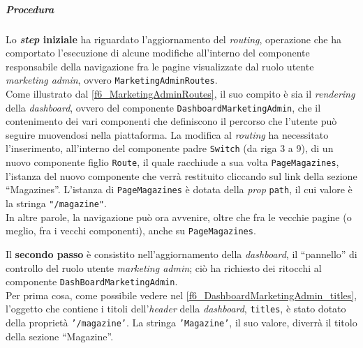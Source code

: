 \subparagraph{Procedura}
Lo \textbf{\textit{step} iniziale} ha riguardato l'aggiornamento del \textit{routing}, operazione che ha comportato l'esecuzione di alcune modifiche all'interno del componente responsabile della navigazione fra le pagine visualizzate dal ruolo utente \textit{marketing admin}, ovvero \texttt{MarketingAdminRoutes}.\\
Come illustrato dal \autoref{f6_MarketingAdminRoutes}, il suo compito è sia il \textit{rendering} della \textit{dashboard}, ovvero del componente \texttt{DashboardMarketingAdmin}, che il contenimento dei vari componenti che definiscono il percorso che l'utente può seguire muovendosi nella piattaforma. La modifica al \textit{routing} ha necessitato l'inserimento, all'interno del componente padre \texttt{Switch} (da riga 3 a 9), di un nuovo componente figlio \texttt{Route}, il quale racchiude a sua volta \texttt{PageMagazines}, l'istanza del nuovo componente che verrà restituito cliccando sul link della sezione “Magazines”. L'istanza di \texttt{PageMagazines} è dotata della \textit{prop} \texttt{path}, il cui valore è la stringa \texttt{"/magazine"}.\\
In altre parole, la navigazione può ora avvenire, oltre che fra le vecchie pagine (o meglio, fra i vecchi componenti), anche su \texttt{PageMagazines}.



Il \textbf{secondo passo} è consistito nell'aggiornamento della \textit{dashboard}, il “pannello” di controllo del ruolo utente \textit{marketing admin}; ciò ha richiesto dei ritocchi al componente \texttt{DashBoardMarketingAdmin}.\\ 
Per prima cosa, come possibile vedere nel \autoref{f6_DashboardMarketingAdmin_titles}, l'oggetto che contiene i titoli dell'\textit{header} della \textit{dashboard}, \texttt{titles}, è stato dotato della proprietà \texttt{'/magazine'}. La stringa \texttt{'Magazine'}, il suo valore, diverrà il titolo della sezione “Magazine”.

